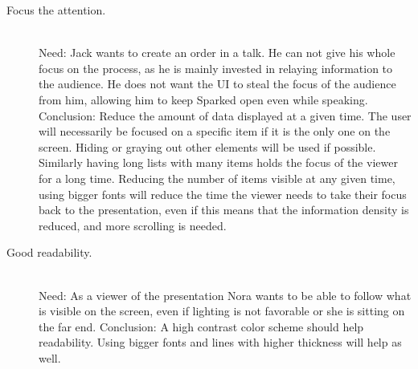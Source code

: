 \begin{description}
\item [Focus the attention.]\hfill \\
Need: Jack wants to create an order in a talk. He can not give his whole focus on the process, as he is mainly invested in relaying information to the audience. He does not want the UI to steal the focus of the audience from him, allowing him to keep Sparked open even while speaking.
Conclusion: Reduce the amount of data displayed at a given time. The user will necessarily be focused on a specific item if it is the only one on the screen. Hiding or graying out other elements will be used if possible.
Similarly having long lists with many items holds the focus of the viewer for a long time. Reducing the number of items visible at any given time, using bigger fonts will reduce the time the viewer needs to take their focus back to the presentation, even if this means that the information density is reduced, and more scrolling is needed. 
\item [Good readability.]\hfill \\
Need: As a viewer of the presentation Nora wants to be able to follow what is visible on the screen, even if lighting is not favorable or she is sitting on the far end. 
Conclusion: A high contrast color scheme should help readability. Using bigger fonts and lines with higher thickness will help as well. 
\end{description}


